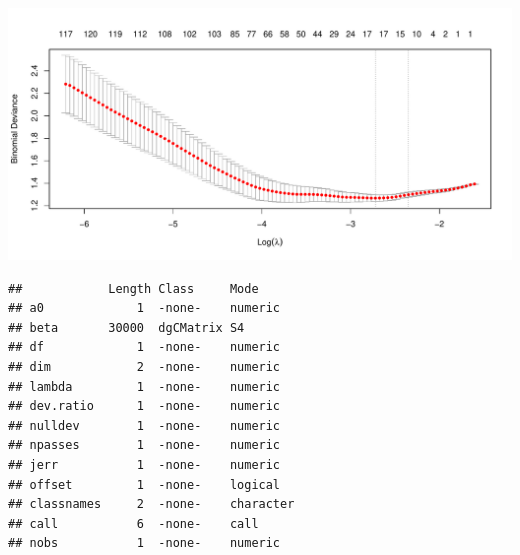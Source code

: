 \documentclass[]{article}
\newenvironment{Shaded}{\begin{snugshade}}{\end{snugshade}}
\newcommand{\CommentTok}[1]{\textcolor[rgb]{0.56,0.35,0.01}{\textit{#1}}}
\newcommand{\DataTypeTok}[1]{\textcolor[rgb]{0.13,0.29,0.53}{#1}}
\newcommand{\DecValTok}[1]{\textcolor[rgb]{0.00,0.00,0.81}{#1}}
\newcommand{\FloatTok}[1]{\textcolor[rgb]{0.00,0.00,0.81}{#1}}
\newcommand{\KeywordTok}[1]{\textcolor[rgb]{0.13,0.29,0.53}{\textbf{#1}}}
\newcommand{\NormalTok}[1]{#1}
\newcommand{\OperatorTok}[1]{\textcolor[rgb]{0.81,0.36,0.00}{\textbf{#1}}}
\newcommand{\StringTok}[1]{\textcolor[rgb]{0.31,0.60,0.02}{#1}}
\begin{document}
\begin{center}\includegraphics[width=1\linewidth]{Project2_as81_files/figure-latex/unnamed-chunk-11-1} \end{center}

\begin{Shaded}
\end{Shaded}

\begin{verbatim}
##            Length Class     Mode     
## a0             1  -none-    numeric  
## beta       30000  dgCMatrix S4       
## df             1  -none-    numeric  
## dim            2  -none-    numeric  
## lambda         1  -none-    numeric  
## dev.ratio      1  -none-    numeric  
## nulldev        1  -none-    numeric  
## npasses        1  -none-    numeric  
## jerr           1  -none-    numeric  
## offset         1  -none-    logical  
## classnames     2  -none-    character
## call           6  -none-    call     
## nobs           1  -none-    numeric
\end{verbatim}
\end{document}
